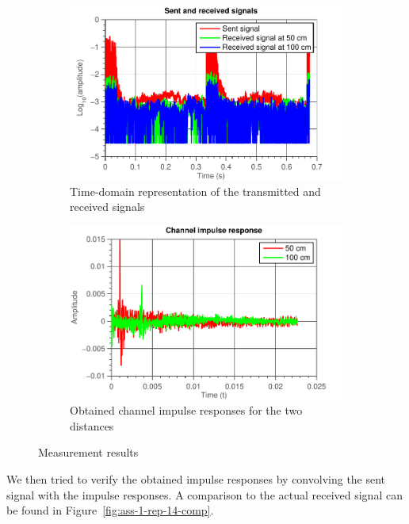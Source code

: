 \documentclass[11pt,titlepage]{report}
\begin{document}
\begin{figure}[H]
	\centering
	\begin{subfigure}{0.49\textwidth}
		\includegraphics[width=\textwidth]{../../deliverable-7-resources/figures/ass-1/report-14-15/ass-1-report-14-sent-received.pdf}
		\caption{\centering Time-domain representation of the transmitted and received signals}
		\label{fig:ass-1-rep-14-rx-tx}
	\end{subfigure}
	\begin{subfigure}{0.49\textwidth}
		\includegraphics[width=\textwidth]{../../deliverable-7-resources/figures/ass-1/report-14-15/ass-1-report-14-impulse-responses.pdf}
		\caption{\centering Obtained channel impulse responses for the two distances}
		\label{fig:ass-1-rep-14-imps}
	\end{subfigure}
	\caption{Measurement results}
	\label{fig:ass-1-rep-14-both}
\end{figure}

We then tried to verify the obtained impulse responses by convolving the sent signal with the impulse responses. A comparison to the actual received signal can be found in Figure~\ref{fig:ass-1-rep-14-comp}.
\end{document}
